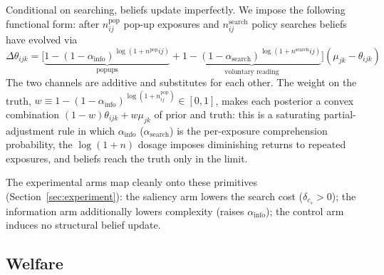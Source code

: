 \documentclass[12pt]{article}
\theoremstyle{definition}
\theoremstyle{remark}
\begin{document}
{Conditional on searching, beliefs update imperfectly. We impose the following functional form: after $n^{\text{pop}}_{ij}$ pop-up exposures and $n^{\text{search}}_{ij}$ policy searches beliefs have evolved via
\begin{equation}\label{eq:em_update}
  \Delta\theta_{ijk} = \Big[\underbrace{1-(1-\alpha_{\text{info}})^{\log(1+n^{\text{pop}}{ij})}}_{\text{popups}} +
  \underbrace{1-(1-\alpha_{\text{search}})^{\log(1+n^{\text{search}}{ij})}}_{\text{voluntary reading}}\Big] (\mu_{jk}-\theta_{ijk})
\end{equation}
The two channels are additive and substitutes for each other. The weight on the truth, $w \equiv 1 - (1-\alpha_{\text{info}})^{\log(1 + n^{\text{pop}}_{ij})} \in [0,1]$, makes each posterior a convex combination $(1-w)\theta_{ijk} + w\mu_{jk}$ of prior and truth: this is a saturating partial-adjustment rule in which $\alpha_{\text{info}}$ ($\alpha_{\text{search}}$) is the per-exposure comprehension probability, the $\log(1+n)$ dosage imposes diminishing returns to repeated exposures, and beliefs reach the truth only in the limit. 

The experimental arms map cleanly onto these primitives (Section~\ref{sec:experiment}): the saliency arm lowers the search cost ($\delta_{c_s} > 0$); the information arm additionally lowers complexity (raises $\alpha_{\text{info}}$); the control arm induces no structural belief update.

\subsection{Welfare}\label{sec:em_welfare}

}
\end{document}
